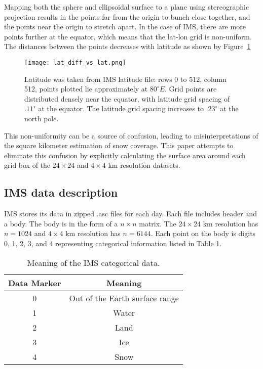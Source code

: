 Mapping both the sphere and ellipsoidal surface to a plane using stereographic projection results in the points far from the origin to bunch close together, and the points near the origin to stretch apart. In the case of IMS, there are more points further at the equator, which means that the lat-lon grid is non-uniform. The distances between the points decreases with latitude as shown by Figure~\ref{fig:lat_diff}

\begin{figure}[ht]
\centering
\begin{minipage}{4.0in}
\texttt{[image: lat\_diff\_vs\_lat.png]}
\caption{Latitude was taken from IMS latitude file: rows 0 to 512, column 512, points plotted lie approximately at $80^{\circ}E$. Grid points are distributed densely near the equator, with latitude grid spacing of $.11^{\circ}$ at the equator. The latitude grid spacing increases to $.23^{\circ}$ at the north pole.}
\label{fig:lat_diff}
\end{minipage}
\end{figure}

This non-uniformity can be a source of confusion, leading to misinterpretations of the square kilometer estimation of snow coverage. This paper attempts to eliminate this confusion by explicitly calculating the surface area around each grid box of the $24 \times 24$ and $4 \times 4$ km resolution datasets.

\subsection{IMS data description}
IMS stores its data in zipped .asc files for each day. Each file includes header and a body. The body is in the form of a $n \times n$ matrix. The $24 \times 24$ km resolution has $n=1024$ and $4 \times 4$ km resolution has $n=6144$. Each point on the body is digits 0, 1, 2, 3, and 4 representing categorical information listed in Table 1. 

\begin{table}[hbt]
\centering
\caption{Meaning of the IMS categorical data.\label{tab1}}
{\begin{tabular}{|c|c|} 
\hline
\textbf{Data Marker} & \textbf{Meaning}
\\ \hline
0 & Out of the Earth surface range
\\ \hline
1 & Water
\\ \hline
2 & Land
\\ \hline
3 & Ice
\\ \hline
4 & Snow
\\ \hline
\end{tabular} }
\end{table}

